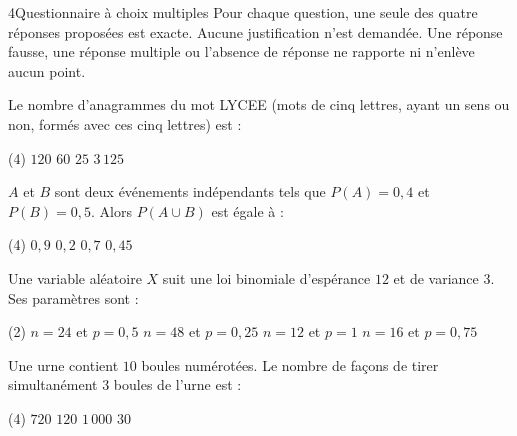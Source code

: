 

\begin{exoBac}{4}{Questionnaire à choix multiples}
Pour chaque question, une seule des quatre réponses proposées est exacte. Aucune justification n'est demandée. Une réponse fausse, une
réponse multiple ou l'absence de réponse ne rapporte ni n'enlève aucun point.
\begin{questions}
  \item Le nombre d'anagrammes du mot LYCEE (mots de cinq lettres, ayant un sens ou non, formés avec ces cinq lettres) est :
\begin{tasks}[label=\alph*)](4)
  \task $120$
  \task $60$
  \task $25$
  \task $3\,125$
\end{tasks}
  \item $A$ et $B$ sont deux événements indépendants tels que $P(A)=0{,}4$ et $P(B)=0{,}5$. Alors $P(A\cup B)$ est égale à :
\begin{tasks}[label=\alph*)](4)
  \task $0{,}9$
  \task $0{,}2$
  \task $0{,}7$
  \task $0{,}45$
\end{tasks}
  \item Une variable aléatoire $X$ suit une loi binomiale d'espérance $12$ et de variance $3$. Ses paramètres sont :
\begin{tasks}[label=\alph*)](2)
  \task $n=24$ et $p=0{,}5$
  \task $n=48$ et $p=0{,}25$
  \task $n=12$ et $p=1$
  \task $n=16$ et $p=0{,}75$
\end{tasks}
  \item Une urne contient $10$ boules numérotées. Le nombre de façons de tirer simultanément $3$ boules de l'urne est :
\begin{tasks}[label=\alph*)](4)
  \task $720$
  \task $120$
  \task $1\,000$
  \task $30$
\end{tasks}
\end{questions}
\end{exoBac}

